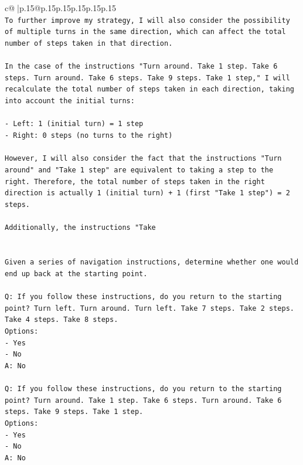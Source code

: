 \documentclass{article}
\begin{document}
{\begin{supertabular}{c@{$\;$}|p{.15\linewidth}@{}p{.15\linewidth}p{.15\linewidth}p{.15\linewidth}p{.15\linewidth}p{.15\linewidth}}
{{{\\ 
\texttt{To further improve my strategy, I will also consider the possibility of multiple turns in the same direction, which can affect the total number of steps taken in that direction.} \\
\\ 
\texttt{In the case of the instructions "Turn around. Take 1 step. Take 6 steps. Turn around. Take 6 steps. Take 9 steps. Take 1 step," I will recalculate the total number of steps taken in each direction, taking into account the initial turns:} \\
\\ 
\texttt{{-} Left: 1 (initial turn) = 1 step} \\
\texttt{{-} Right: 0 steps (no turns to the right)} \\
\\ 
\texttt{However, I will also consider the fact that the instructions "Turn around" and "Take 1 step" are equivalent to taking a step to the right. Therefore, the total number of steps taken in the right direction is actually 1 (initial turn) + 1 (first "Take 1 step") = 2 steps.} \\
\\ 
\texttt{Additionally, the instructions "Take} \\
\\ 
\\ 
\texttt{Given a series of navigation instructions, determine whether one would end up back at the starting point.} \\
\\ 
\texttt{Q: If you follow these instructions, do you return to the starting point? Turn left. Turn around. Turn left. Take 7 steps. Take 2 steps. Take 4 steps. Take 8 steps.} \\
\texttt{Options:} \\
\texttt{{-} Yes} \\
\texttt{{-} No} \\
\texttt{A: No} \\
\\ 
\texttt{Q: If you follow these instructions, do you return to the starting point? Turn around. Take 1 step. Take 6 steps. Turn around. Take 6 steps. Take 9 steps. Take 1 step.} \\
\texttt{Options:} \\
\texttt{{-} Yes} \\
\texttt{{-} No} \\
\texttt{A: No} \\
\\ 
}}}
\end{supertabular}}
\end{document}
